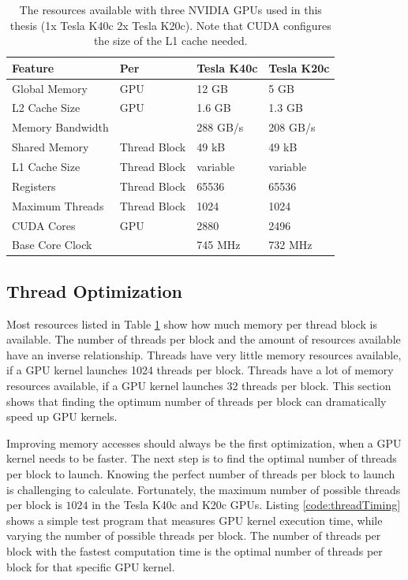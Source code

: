 \begin{table}
\captionsetup{width=6in}
\caption{The resources available with three NVIDIA GPUs used in this thesis (1x Tesla K40c 2x Tesla K20c). Note that CUDA configures the size of the L1 cache needed.}
\begin{center}
\begin{tabular}{llll}
	\toprule
	Feature 			& Per			& Tesla K40c 	& Tesla K20c	\\ \midrule
	Global Memory 		& GPU			& 12 GB	 		& 5 GB			\\
	L2 Cache Size 		& GPU			& 1.6 GB		& 1.3 GB		\\
	Memory Bandwidth	& 				& 288 GB/s		& 208 GB/s		\\		
	Shared Memory 		& Thread Block	& 49 kB			& 49 kB			\\
	L1 Cache Size 		& Thread Block	& variable		& variable		\\
	Registers			& Thread Block	& 65536			& 65536			\\
	Maximum Threads		& Thread Block	& 1024			& 1024			\\
	CUDA Cores 			& GPU			& 2880 			& 2496 			\\
	Base Core Clock 	&				& 745 MHz 		& 732 MHz		\\ \bottomrule
\end{tabular}
\end{center}
\label{tab:gpu-resources_jeffs}
\end{table}

\subsection{Thread Optimization}
Most resources listed in Table \ref{tab:gpu-resources_jeffs} show how much memory per thread block is available. 
The number of threads per block and the amount of resources available have an inverse relationship.
Threads have very little memory resources available, if a GPU kernel launches 1024 threads per block.
Threads have a lot of memory resources available, if a GPU kernel launches 32 threads per block.
This section shows that finding the optimum number of threads per block can dramatically speed up GPU kernels.

Improving memory accesses should always be the first optimization, when a GPU kernel needs to be faster.
The next step is to find the optimal number of threads per block to launch.
Knowing the perfect number of threads per block to launch is challenging to calculate.
Fortunately, the maximum number of possible threads per block is $1024$ in the Tesla K40c and K20c GPUs.
Listing \ref{code:threadTiming} shows a simple test program that measures GPU kernel execution time, while varying the number of possible threads per block.
The number of threads per block with the fastest computation time is the optimal number of threads per block for that specific GPU kernel.

